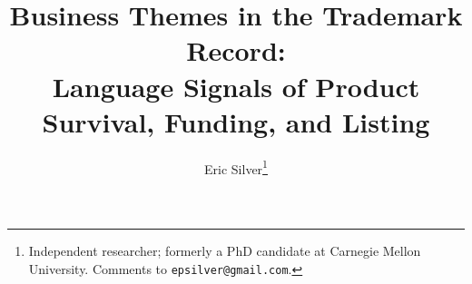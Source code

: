 
\newcommand{\onlineappendixnote}{\url{https://aporia.institute/tm-vocabulary/online-appendix/themes_T50.html}}
\graphicspath{{../}}
\makeatletter{}\makeatother
\title{\bfseries Business Themes in the Trademark Record:\\
\large Language Signals of Product Survival, Funding, and Listing}
\author{Eric Silver\thanks{Independent researcher; formerly a PhD candidate
at Carnegie Mellon University. Comments to \texttt{epsilver@gmail.com}.}}
\date{}


\maketitle












\appendix





